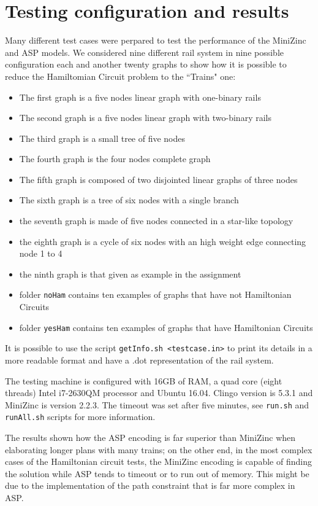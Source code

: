 \documentclass[11pt]{article}
\begin{document}
\section{Testing configuration and results}

Many different test cases were perpared to test the performance of the MiniZinc and ASP models. We considered nine different rail system in 
nine possible configuration each and another twenty graphs to show how it is possible to reduce the Hamiltomian Circuit problem to 
the ``Trains" one:

\begin{itemize}
\item The first graph is a five nodes linear graph with one-binary rails
\item The second graph is a five nodes linear graph with two-binary rails
\item The third graph is a small tree of five nodes
\item The fourth graph is the four nodes complete graph
\item The fifth graph is composed of two disjointed linear graphs of three nodes
\item The sixth graph is a tree of six nodes with a single branch
\item the seventh graph is made of five nodes connected in a star-like topology
\item the eighth graph is a cycle of six nodes with an high weight edge connecting node 1 to 4
\item the ninth graph is that given as example in the assignment
\item folder \verb+noHam+ contains ten examples of graphs that have not Hamiltonian Circuits
\item folder \verb+yesHam+ contains ten examples of graphs that have Hamiltonian Circuits
\end{itemize}

It is possible to use the script \verb+getInfo.sh <testcase.in>+ to print its details in a more readable format and have a .dot 
representation of the rail system.  

The testing machine is configured with 16GB of RAM, a quad core (eight threads) Intel i7-2630QM processor and Ubuntu 16.04. 
Clingo version is 5.3.1 and MiniZinc is version 2.2.3. The timeout was set after five minutes, see \verb+run.sh+ and \verb+runAll.sh+
scripts for more information.

The results shown how the ASP encoding is far superior than MiniZinc when elaborating longer plans with many trains; on the other 
end, in the most complex cases of the Hamiltonian circuit tests, the MiniZinc encoding is capable of finding the solution while
ASP tends to timeout or to run out of memory. This might be due to the implementation of the path constraint that is far more 
complex in ASP.
\end{document}
